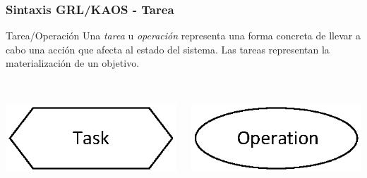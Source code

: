 \documentclass[slidestop,xcolor=pst,dvips,blue]{beamer}
\begin{document}
\begin{frame}[c]
	\frametitle{Sintaxis GRL/KAOS - Tarea}
	\begin{block}{Tarea/Operación}
		Una \alert{\emph{tarea}} u \alert{\emph{operación}} representa una forma concreta de llevar a cabo una acción que afecta al estado del sistema.
		Las tareas representan la materialización de un objetivo.
		\ \\
		\ \\
		\begin{columns}[c]
			\begin{column}{0.50\linewidth}
				\centering \includegraphics[width=0.5\columnwidth,keepaspectratio=true]{images/objetivos/task(GRL).eps}
			\end{column}
			\begin{column}{0.50\linewidth}
				\centering \includegraphics[width=0.5\columnwidth,keepaspectratio=true]{images/objetivos/operation(KAOS).eps}
			\end{column}
		\end{columns}
	\end{block}
\end{frame}
\end{document}
